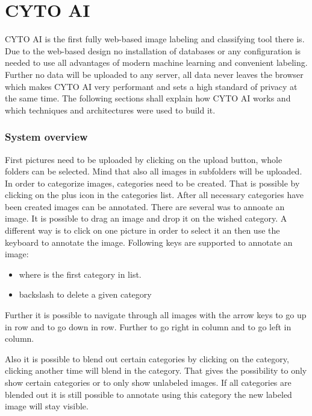 \chapter{CYTO AI}
CYTO AI is the first fully web-based image labeling and classifying tool there is. Due to the web-based design no installation of databases or any configuration is needed to use all advantages of modern machine learning and convenient labeling. Further no data will be uploaded to any server, all data never leaves the browser which makes CYTO AI very performant and sets a high standard of privacy at the same time. The following sections shall explain how CYTO AI works and which techniques and architectures were used to build it.

\subsection{System overview}
First pictures need to be uploaded by clicking on the upload button, whole folders can be selected. Mind that also all images in subfolders will be uploaded. In order to categorize images, categories need to be created. That is possible by clicking on the plus icon in the categories list. After all necessary categories have been created images can be annotated. There are several was to annoate an image. It is possible to drag an image and drop it on the wished category. A different way is to click on one picture in order to select it an then use the keyboard to annotate the image. Following keys are supported to annotate an image:

\begin{itemize}
	\item {}      
	   where  is the first category in list.
	\item \keystroke{$\Leftarrow$} backslash to delete a given category
\end{itemize}

Further it is possible to navigate through all images with the arrow keys \keystroke{$\Uparrow$} to go up in row and 
 \keystroke{$\Downarrow$} to go down in row. Further \keystroke{$\Rightarrow$} to go right in column and \keystroke{$\Leftarrow$} to go left in column.


Also it is possible to blend out certain categories by clicking on the category, clicking another time will blend in the category. That gives the possibility to only show certain categories or to only show unlabeled images.
If all categories are blended out it is still possible to annotate using this category the new labeled image will stay visible.

